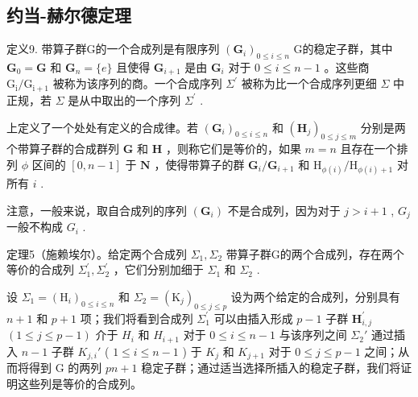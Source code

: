 \subsection{约当-赫尔德定理}

定义9. 带算子群G的一个合成列是有限序列 \((\mathbf{G}_i)_{0\leqslant i\leqslant n}\) G的稳定子群，其中 \(\mathbf{G}_0 = \mathbf{G}\) 和 \(\mathbf{G}_n = \{e\}\) 且使得 \(\mathbf{G}_{i + 1}\) 是由 \(\mathbf{G}_i\) 对于 \(0\leqslant i\leqslant n - 1\) 。这些商 \(\mathrm{G_i / G_{i + 1}}\) 被称为该序列的商。一个合成序列 \(\Sigma^{\prime}\) 被称为比一个合成序列更细 \(\Sigma\) 中正规，若 \(\Sigma\) 是从中取出的一个序列 \(\Sigma^{\prime}\) .

上定义了一个处处有定义的合成律。若 \((\mathbf{G}_i)_{0\leqslant i\leqslant n}\) 和 \((\mathbf{H}_j)_{0\leqslant j\leqslant m}\) 分别是两个带算子群的合成群列 \(\mathbf{G}\) 和 \(\mathbf{H}\) ，则称它们是等价的，如果 \(m = n\) 且存在一个排列 \(\phi\) 区间的 \([0,n - 1]\) 于 \(\mathbf{N}\) ，使得带算子的群 \(\mathbf{G}_i / \mathbf{G}_{i + 1}\) 和 \(\mathrm{H}_{\phi (i)} / \mathrm{H}_{\phi (i) + 1}\) 对所有 \(i\) .

注意，一般来说，取自合成列的序列 \((\mathbf{G}_{i})\) 不是合成列，因为对于 \(j > i + 1\) , \(G_{j}\) 一般不构成 \(G_{i}\) .

定理5（施赖埃尔）。给定两个合成列 \(\Sigma_{1}, \Sigma_{2}\) 带算子群G的两个合成列，存在两个等价的合成列 \(\Sigma_{1}^{\prime}, \Sigma_{2}^{\prime}\) ，它们分别加细于 \(\Sigma_{1}\) 和 \(\Sigma_{2}\) .

设 \(\Sigma_{1} = (\mathrm{H}_{i})_{0\leqslant i\leqslant n}\) 和 \(\Sigma_{2} = (\mathrm{K}_{j})_{0\leqslant j\leqslant p}\) 设为两个给定的合成列，分别具有 \(n + 1\) 和 \(p + 1\) 项；我们将看到合成列 \(\Sigma_1^\prime\) 可以由插入形成 \(p - 1\) 子群 \(\mathbf{H}_{i,j}^{\prime}\) \((1 \leqslant j \leqslant p - 1)\) 介于 \(H_{i}\) 和 \(H_{i+1}\) 对于 \(0 \leqslant i \leqslant n - 1\) 与该序列之间 \(\Sigma_{2}'\) 通过插入 \(n - 1\) 子群 \(K_{j,i}'\) ( \(1 \leqslant i \leqslant n - 1\) ) 于 \(K_{j}\) 和 \(K_{j+1}\) 对于 \(0 \leqslant j \leqslant p - 1\) 之间；从而将得到 G 的两列 \(pn + 1\) 稳定子群；通过适当选择所插入的稳定子群，我们将证明这些列是等价的合成列。

